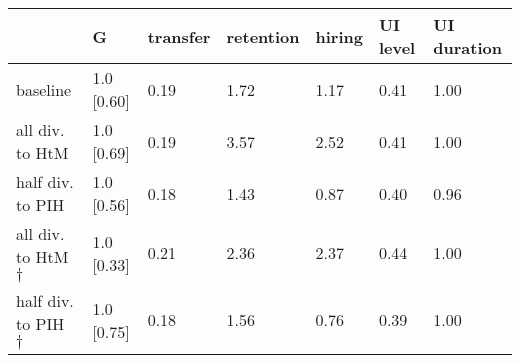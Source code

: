\begin{tabular}{lllllll}
\toprule
 & \textbf{G} & \textbf{transfer} & \textbf{retention} & \textbf{hiring} & \textbf{UI level} & \textbf{UI duration} \\
\midrule
baseline & 1.0 [0.60] & 0.19 & 1.72 & 1.17 & 0.41 & 1.00 \\
all div. to HtM & 1.0 [0.69] & 0.19 & 3.57 & 2.52 & 0.41 & 1.00 \\
half div. to PIH & 1.0 [0.56] & 0.18 & 1.43 & 0.87 & 0.40 & 0.96 \\
all div. to HtM $\dagger$ & 1.0 [0.33] & 0.21 & 2.36 & 2.37 & 0.44 & 1.00 \\
half div. to PIH $\dagger$ & 1.0 [0.75] & 0.18 & 1.56 & 0.76 & 0.39 & 1.00 \\
\bottomrule
\end{tabular}
